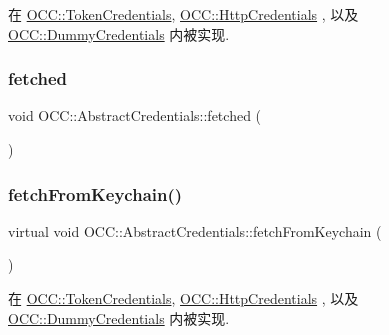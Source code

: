 在 \hyperlink{class_o_c_c_1_1_token_credentials_a6d8de7c4c65b7b08cfd86a140afa51a9}{O\+C\+C\+::\+Token\+Credentials}, \hyperlink{class_o_c_c_1_1_http_credentials_acce877fa4e92ef60246a048cb4b073ac}{O\+C\+C\+::\+Http\+Credentials} , 以及 \hyperlink{class_o_c_c_1_1_dummy_credentials_af712b0e77040f513ab91771cdc167f16}{O\+C\+C\+::\+Dummy\+Credentials} 内被实现.

\mbox{\label{class_o_c_c_1_1_abstract_credentials_aaaebacf10df888ed98e4b6974fd3cfaa}} 
\subsubsection{\texorpdfstring{fetched}{fetched}}
{\footnotesize\ttfamily void O\+C\+C\+::\+Abstract\+Credentials\+::fetched (\begin{DoxyParamCaption}{ }\end{DoxyParamCaption})\hspace{0.3cm}{\ttfamily [signal]}}

\mbox{\label{class_o_c_c_1_1_abstract_credentials_aac58b02f74811eeedb0fd944bf8a20c3}} 
\subsubsection{\texorpdfstring{fetch\+From\+Keychain()}{fetchFromKeychain()}}
{\footnotesize\ttfamily virtual void O\+C\+C\+::\+Abstract\+Credentials\+::fetch\+From\+Keychain (\begin{DoxyParamCaption}{ }\end{DoxyParamCaption})\hspace{0.3cm}{\ttfamily [pure virtual]}}



在 \hyperlink{class_o_c_c_1_1_token_credentials_a6089c9b79dc88288db02f0fb059c7827}{O\+C\+C\+::\+Token\+Credentials}, \hyperlink{class_o_c_c_1_1_http_credentials_a2408a2a5b97336cc09219323e98bca65}{O\+C\+C\+::\+Http\+Credentials} , 以及 \hyperlink{class_o_c_c_1_1_dummy_credentials_a4b73e13551260fbd397fc300c833c5cc}{O\+C\+C\+::\+Dummy\+Credentials} 内被实现.

